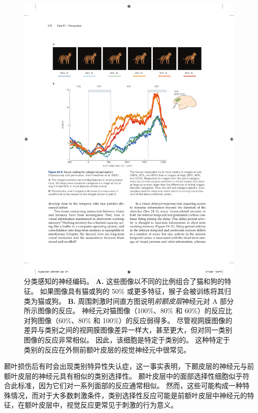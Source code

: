 \begin{figure}[htbp]
	\centering
	\includegraphics[width=1.0\linewidth]{chap24/fig_24_8}
	\caption{分类感知的神经编码。
		\textbf{A.} 这些图像以不同的比例组合了猫和狗的特征。
		如果图像具有猫或狗的 50\% 或更多特征，猴子会被训练将其归类为猫或狗。
		\textbf{B.} 周围刺激时间直方图说明\textit{前额皮层}神经元对 A 部分所示图像的反应。
		神经元对猫图像（100\%、80\% 和 60\%）的反应比对狗图像（60\%、80\% 和 100\%）的反应弱得多。
		尽管视网膜图像的差异与类别之间的视网膜图像差异一样大，甚至更大，但对同一类别图像的反应非常相似。
		因此，该细胞是特定于类别的。
		这种特定于类别的反应在外侧前额叶皮层的视觉神经元中很常见。}
	\label{fig:24_8}
\end{figure}


颞叶损伤后有时会出现类别特异性失认症，这一事实表明，下颞皮层的神经元与前额叶皮层的神经元具有相似的类别选择性。
颞叶皮层中的面部选择性细胞似乎符合此标准，因为它们对一系列面部的反应通常相似。
然而，这些可能构成一种特殊情况，而对于大多数刺激条件，类别选择性反应可能是前额叶皮层中神经元的特征，在额叶皮层中，视觉反应更常见于刺激的行为意义。




